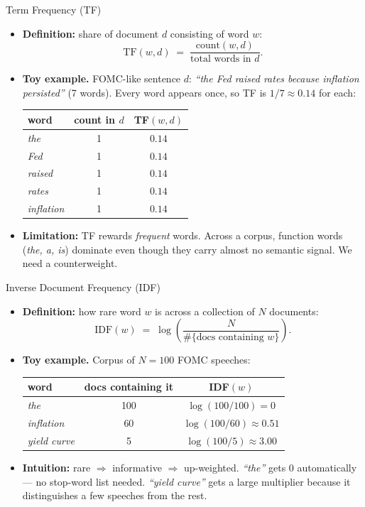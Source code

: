 \documentclass[10pt,english,aspectratio=169]{beamer}
\begin{document}
\begin{frame}{Term Frequency (TF)}
\begin{itemize}
\item \textbf{Definition:} share of document $d$ consisting of word $w$:
\[
   \text{TF}(w, d) \;=\; \frac{\text{count}(w, d)}{\text{total words in } d}.
\]

\medskip
\item \textbf{Toy example.} FOMC-like sentence $d$: \emph{``the Fed raised rates because inflation persisted''} (7 words). Every word appears once, so TF is $1/7 \approx 0.14$ for each:
\begin{center}
\begin{tabular}{l c c}
\toprule
word & count in $d$ & TF$(w,d)$ \\
\midrule
\emph{the} & 1 & $0.14$ \\
\emph{Fed} & 1 & $0.14$ \\
\emph{raised} & 1 & $0.14$ \\
\emph{rates} & 1 & $0.14$ \\
\emph{inflation} & 1 & $0.14$ \\
\bottomrule
\end{tabular}
\end{center}

\medskip
\item \textbf{Limitation:} TF rewards \emph{frequent} words. Across a corpus, function words (\emph{the, a, is}) dominate even though they carry almost no semantic signal. We need a counterweight.
\end{itemize}
\end{frame}

\begin{frame}{Inverse Document Frequency (IDF)}
\begin{itemize}
\item \textbf{Definition:} how rare word $w$ is across a collection of $N$ documents:
\[
   \text{IDF}(w) \;=\; \log\!\left(\frac{N}{\#\{\text{docs containing } w\}}\right).
\]

\medskip
\item \textbf{Toy example.} Corpus of $N = 100$ FOMC speeches:
\begin{center}
\begin{tabular}{l c c}
\toprule
word & docs containing it & IDF$(w)$ \\
\midrule
\emph{the}         & 100 & $\log(100/100) = 0$ \\
\emph{inflation}   & 60  & $\log(100/60) \approx 0.51$ \\
\emph{yield curve} & 5   & $\log(100/5) \approx 3.00$ \\
\bottomrule
\end{tabular}
\end{center}

\medskip
\item \textbf{Intuition:} rare $\Rightarrow$ informative $\Rightarrow$ up-weighted. \emph{``the''} gets $0$ automatically --- no stop-word list needed. \emph{``yield curve''} gets a large multiplier because it distinguishes a few speeches from the rest.
\end{itemize}
\end{frame}
\end{document}
